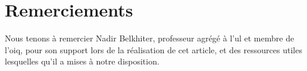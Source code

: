 \section*{Remerciements}
Nous tenons à remercier Nadir Belkhiter, professeur agrégé à l'\gls{ul} et membre de l'\gls{oiq}, pour son support lors de la réalisation de cet article, et des ressources utiles lesquelles qu'il a mises à notre disposition.
